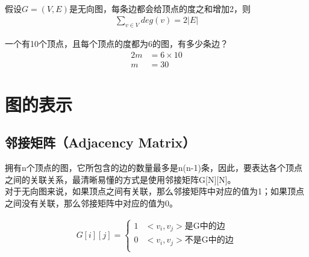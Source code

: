 \begin{tcolorbox}
	\\
	假设$ G = (V, E) $是无向图，每条边都会给顶点的度之和增加2，则
	\begin{align}
		\sum_{v \in V} deg(v) = 2|E|
	\end{align}
\end{tcolorbox}

\begin{tcolorbox}
	一个有10个顶点，且每个顶点的度都为6的图，有多少条边？
	\begin{align*}
		2m & = 6 \times 10 \\
		m  & = 30
	\end{align*}
\end{tcolorbox}

\newpage

\section{图的表示}

\subsection{邻接矩阵（Adjacency Matrix）}

拥有n个顶点的图，它所包含的边的数量最多是n(n-1)条，因此，要表达各个顶点之间的关联关系，最清晰易懂的方式是使用邻接矩阵G[N][N]。\\

对于无向图来说，如果顶点之间有关联，那么邻接矩阵中对应的值为1；如果顶点之间没有关联，那么邻接矩阵中对应的值为0。

\vspace{-0.5cm}

\begin{align}\nonumber
	G[i][j] = \begin{cases}
		1 & <v_i, v_j>\text{是G中的边}   \\
		0 & <v_i, v_j>\text{不是G中的边} \\
	\end{cases}
\end{align}

\begin{figure}[H]
	\centering
\end{figure}

